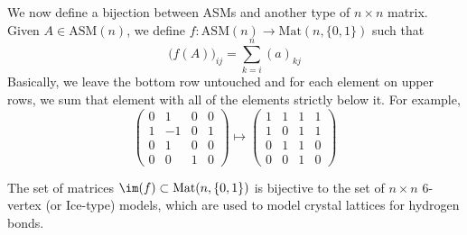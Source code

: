   We now define a bijection between ASMs and another type of $n \times n$ matrix. Given $A \in \text{ASM}(n)$, we define $f: \text{ASM}(n) \longrightarrow \text{Mat}(n, \{0,1\})$ such that
  \begin{equation}
    \big(f(A)\big)_{ij} = \sum_{k=i}^n (a)_{kj}
  \end{equation}
  Basically, we leave the bottom row untouched and for each element on upper rows, we sum that element with all of the elements strictly below it. For example, 
  \[\begin{pmatrix}
  0&1&0&0\\1&-1&0&1\\0&1&0&0\\0&0&1&0
  \end{pmatrix} \mapsto \begin{pmatrix}
  1&1&1&1\\1&0&1&1\\0&1&1&0\\0&0&1&0
  \end{pmatrix}\]

  \begin{theorem}
  The set of matrices $\im(f) \subset \text{Mat}(n, \{0, 1\})$ is bijective to the set of $n \times n$ 6-vertex (or Ice-type) models, which are used to model crystal lattices for hydrogen bonds. 
  \end{theorem}

